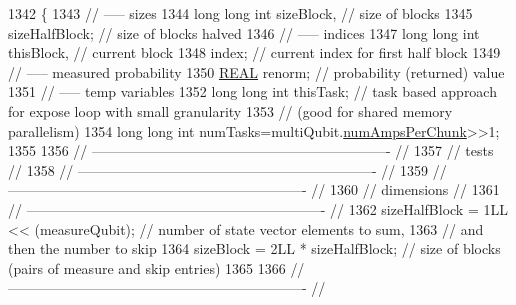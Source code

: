 \begin{DoxyCode}
1342 \{
1343     \textcolor{comment}{// ----- sizes}
1344     \textcolor{keywordtype}{long} \textcolor{keywordtype}{long} \textcolor{keywordtype}{int} sizeBlock,                                           \textcolor{comment}{// size of blocks}
1345          sizeHalfBlock;                                       \textcolor{comment}{// size of blocks halved}
1346     \textcolor{comment}{// ----- indices}
1347     \textcolor{keywordtype}{long} \textcolor{keywordtype}{long} \textcolor{keywordtype}{int} thisBlock,                                           \textcolor{comment}{// current block}
1348          index;                                               \textcolor{comment}{// current index for first half block}
1349     \textcolor{comment}{// ----- measured probability}
1350     \mbox{\hyperlink{QuEST__precision_8h_a4b654506f18b8bfd61ad2a29a7e38c25}{REAL}}   renorm;                                    \textcolor{comment}{// probability (returned) value}
1351     \textcolor{comment}{// ----- temp variables}
1352     \textcolor{keywordtype}{long} \textcolor{keywordtype}{long} \textcolor{keywordtype}{int} thisTask;                                   \textcolor{comment}{// task based approach for expose loop with
       small granularity}
1353     \textcolor{comment}{// (good for shared memory parallelism)}
1354     \textcolor{keywordtype}{long} \textcolor{keywordtype}{long} \textcolor{keywordtype}{int} numTasks=multiQubit.\mbox{\hyperlink{structMultiQubit_a1cad83601a78635dd278259c7ed54f18}{numAmpsPerChunk}}>>1;
1355 
1356     \textcolor{comment}{// ---------------------------------------------------------------- //}
1357     \textcolor{comment}{//            tests                                                 //}
1358     \textcolor{comment}{// ---------------------------------------------------------------- //}
1359     \textcolor{comment}{// ---------------------------------------------------------------- //}
1360     \textcolor{comment}{//            dimensions                                            //}
1361     \textcolor{comment}{// ---------------------------------------------------------------- //}
1362     sizeHalfBlock = 1LL << (measureQubit);                       \textcolor{comment}{// number of state vector elements to sum,}
1363     \textcolor{comment}{// and then the number to skip}
1364     sizeBlock     = 2LL * sizeHalfBlock;                           \textcolor{comment}{// size of blocks (pairs of measure and
       skip entries)}
1365 
1366     \textcolor{comment}{// ---------------------------------------------------------------- //}

\end{DoxyCode}
